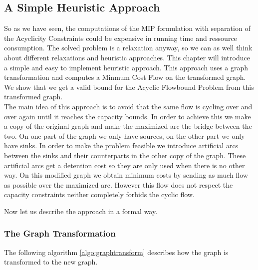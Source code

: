 \newpage
\subsection{A Simple Heuristic Approach}

So as we have seen, the computations of the MIP formulation with separation of the Acyclicity Constraints could be 
expensive in running time and ressource consumption. The solved problem is a relaxation anyway, so we can as well think 
about different relaxations and heuristic approaches. This chapter will introduce a simple and easy to 
implement heuristic approach. This approach uses a graph transformation and computes a Minmum Cost Flow on the 
transformed graph. We show that we get a valid bound for the Acyclic Flowbound Problem from this transformed graph.\\

The main idea of this approach is to avoid that the same flow is cycling over and over again until it reaches the 
capacity bounds. In order to achieve this we make a copy of the original graph and make the maximized arc the bridge 
between the two. On one part of the graph we only have sources, on the other part we only have sinks. In order 
to make 
the problem feasible we introduce artificial arcs between the sinks and their counterparts in the other copy of the 
graph. These artificial arcs get a detention cost so they are only used when there is no other way. On this modified 
graph we obtain minimum costs by sending as much flow as possible over the maximized arc. However this flow does not 
respect the capacity constraints neither completely forbids the cyclic flow. 

Now let us describe the approach in a formal way.

\subsubsection*{The Graph Transformation}

The following algorithm \ref{algo:graphtransform} describes how the graph is transformed to the new graph.

